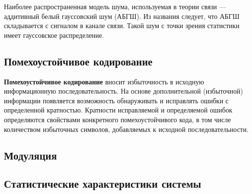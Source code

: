 Наиболее распространенная модель шума, используемая в теории связи --- аддитивный белый гауссовский шум (АБГШ). Из названия следует, что АБГШ складывается с сигналом в канале связи. Такой шум с точки зрения статистики имеет гауссовское распределение.

\subsection{Помехоустойчивое кодирование}
\textbf{Помехоустойчивое кодирование} вносит избыточность в исходную информационную последовательность. На основе дополнительной (избыточной) информации появляется возможность обнаруживать и исправлять ошибки с определенной кратностью. Кратности исправляемой и определяемой ошибок определяются свойствами конкретного помехоустойчивого кода, в том числе количеством избыточных символов, добавляемых к исходной последовательности.
\subsection{Модуляция}

\subsection{Статистические характеристики системы}
